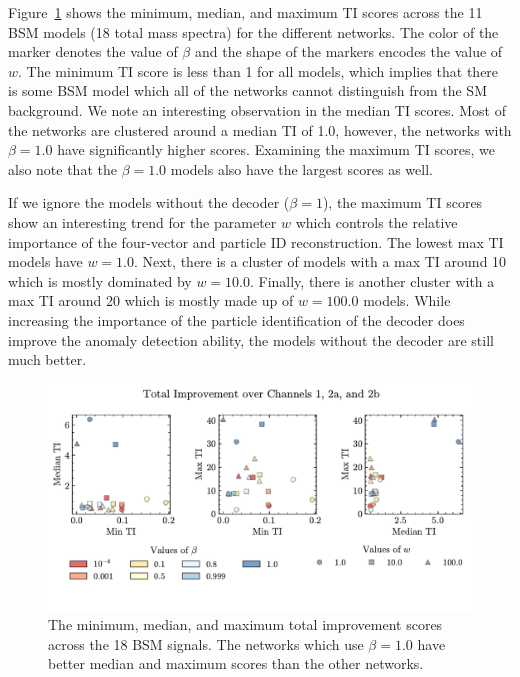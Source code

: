 \documentclass[submission, Phys]{SciPost}
\begin{document}
Figure~\ref{fig:TI} shows the minimum, median, and maximum TI scores across the 11 BSM models (18 total mass spectra) for the different networks.
The color of the marker denotes the value of $\beta$ and the shape of the markers encodes the value of $w$. 
The minimum TI score is less than 1 for all models, which implies that there is some BSM model which all of the networks cannot distinguish from the SM background.
We note an interesting observation in the median TI scores.
Most of the networks are clustered around a median TI of 1.0, however, the networks with $\beta=1.0$ have significantly higher scores.
Examining the maximum TI scores, we also note that the $\beta=1.0$ models also have the largest scores as well.

If we ignore the models without the decoder ($\beta=1$), the maximum TI scores show an interesting trend for the parameter $w$ which controls the relative importance of the four-vector and particle ID reconstruction.
The lowest max TI models have $w=1.0$.
Next, there is a cluster of models with a max TI around 10  which is mostly dominated by $w=10.0$.
Finally, there is another cluster with a max TI around 20 which is mostly made up of $w=100.0$ models.
While increasing the importance of the particle identification of the decoder does improve the anomaly detection ability, the models without the decoder are still much better.


\begin{figure}[t]
    \begin{center}
    \includegraphics[width=\linewidth]{figures/TotalImprovementClustering.pdf}
    \vspace{-3em}
    \caption{The minimum, median, and maximum total improvement scores across the 18 BSM signals. The networks which use $\beta=1.0$ have better median and maximum scores than the other networks.}
    \label{fig:TI}
    \vspace{-1em}
\end{center}
\end{figure}
\end{document}
